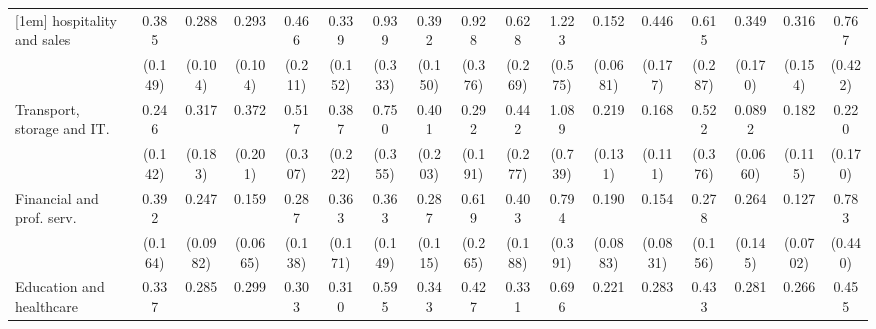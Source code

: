 {\begin{tabular}{l*{16}{c}}
[1em]
hospitality and sales&       0.385\sym{*}  &       0.288\sym{***}&       0.293\sym{***}&       0.466         &       0.339\sym{*}  &       0.939         &       0.392\sym{*}  &       0.928         &       0.628         &       1.223         &       0.152\sym{***}&       0.446\sym{*}  &       0.615         &       0.349\sym{*}  &       0.316\sym{*}  &       0.767         \\
                    &     (0.149)         &     (0.104)         &     (0.104)         &     (0.211)         &     (0.152)         &     (0.333)         &     (0.150)         &     (0.376)         &     (0.269)         &     (0.575)         &    (0.0681)         &     (0.177)         &     (0.287)         &     (0.170)         &     (0.154)         &     (0.422)         \\
[1em]
Transport, storage and IT.&       0.246\sym{*}  &       0.317\sym{*}  &       0.372         &       0.517         &       0.387         &       0.750         &       0.401         &       0.292         &       0.442         &       1.089         &       0.219\sym{*}  &       0.168\sym{**} &       0.522         &      0.0892\sym{**} &       0.182\sym{**} &       0.220         \\
                    &     (0.142)         &     (0.183)         &     (0.201)         &     (0.307)         &     (0.222)         &     (0.355)         &     (0.203)         &     (0.191)         &     (0.277)         &     (0.739)         &     (0.131)         &     (0.111)         &     (0.376)         &    (0.0660)         &     (0.115)         &     (0.170)         \\
[1em]
Financial and prof. serv.&       0.392\sym{*}  &       0.247\sym{***}&       0.159\sym{***}&       0.287\sym{**} &       0.363\sym{*}  &       0.363\sym{*}  &       0.287\sym{**} &       0.619         &       0.403         &       0.794         &       0.190\sym{***}&       0.154\sym{***}&       0.278\sym{*}  &       0.264\sym{*}  &       0.127\sym{***}&       0.783         \\
                    &     (0.164)         &    (0.0982)         &    (0.0665)         &     (0.138)         &     (0.171)         &     (0.149)         &     (0.115)         &     (0.265)         &     (0.188)         &     (0.391)         &    (0.0883)         &    (0.0831)         &     (0.156)         &     (0.145)         &    (0.0702)         &     (0.440)         \\
[1em]
Education and healthcare&       0.337\sym{**} &       0.285\sym{**} &       0.299\sym{**} &       0.303\sym{**} &       0.310\sym{*}  &       0.595         &       0.343\sym{**} &       0.427         &       0.331\sym{*}  &       0.696         &       0.221\sym{***}&       0.283\sym{**} &       0.433         &       0.281\sym{*}  &       0.266\sym{**} &       0.455         \\

\end{tabular}}
